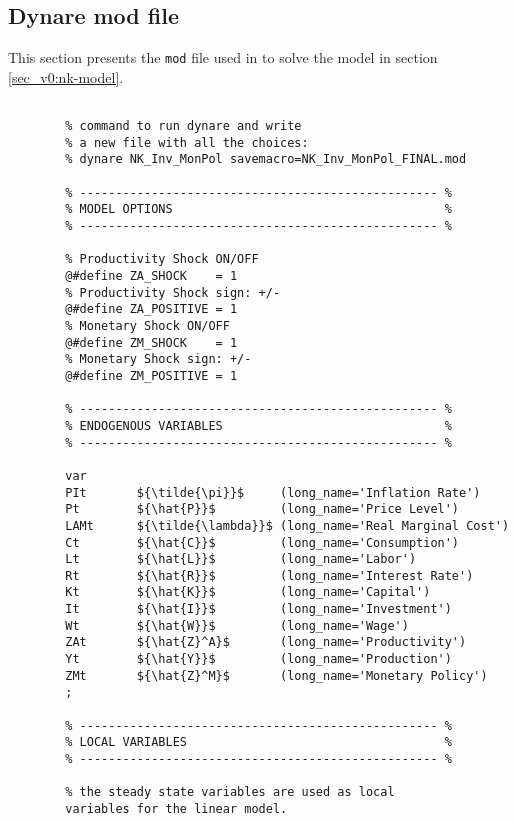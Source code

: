 \documentclass[
thesis.tex
]{subfiles}
\begin{document}
\newpage

\subsection{Dynare mod file}

This section presents the \texttt{mod} file used in \dynare to solve the model in section \ref{sec_v0:nk-model}.

\vspace*{-0.5cm}

{\singlespacing
	
	\begin{verbatim} 
		
		% command to run dynare and write
		% a new file with all the choices:
		% dynare NK_Inv_MonPol savemacro=NK_Inv_MonPol_FINAL.mod
		
		% -------------------------------------------------- %
		% MODEL OPTIONS                                      %
		% -------------------------------------------------- %
		
		% Productivity Shock ON/OFF
		@#define ZA_SHOCK    = 1
		% Productivity Shock sign: +/-
		@#define ZA_POSITIVE = 1
		% Monetary Shock ON/OFF
		@#define ZM_SHOCK    = 1
		% Monetary Shock sign: +/-
		@#define ZM_POSITIVE = 1
		
		% -------------------------------------------------- %
		% ENDOGENOUS VARIABLES                               %
		% -------------------------------------------------- %
		
		var
		PIt       ${\tilde{\pi}}$     (long_name='Inflation Rate')
		Pt        ${\hat{P}}$         (long_name='Price Level')
		LAMt      ${\tilde{\lambda}}$ (long_name='Real Marginal Cost')
		Ct        ${\hat{C}}$         (long_name='Consumption')
		Lt        ${\hat{L}}$         (long_name='Labor')
		Rt        ${\hat{R}}$         (long_name='Interest Rate')
		Kt        ${\hat{K}}$         (long_name='Capital')
		It        ${\hat{I}}$         (long_name='Investment')
		Wt        ${\hat{W}}$         (long_name='Wage')
		ZAt       ${\hat{Z}^A}$       (long_name='Productivity')
		Yt        ${\hat{Y}}$         (long_name='Production')
		ZMt       ${\hat{Z}^M}$       (long_name='Monetary Policy')
		;
		
		% -------------------------------------------------- %
		% LOCAL VARIABLES                                    %
		% -------------------------------------------------- %
		
		% the steady state variables are used as local 
		variables for the linear model.
		

\end{verbatim}}
\end{document}
